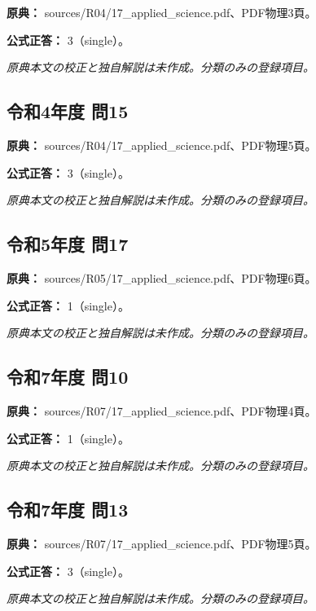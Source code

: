 \noindent\textbf{原典：} sources/R04/17\_applied\_science.pdf、PDF物理3頁。

\textbf{公式正答：} 3（single）。

\par\textit{原典本文の校正と独自解説は未作成。分類のみの登録項目。}

\subsection{令和4年度 問15}
\label{q:r04-reg-applied-15}

\noindent\textbf{原典：} sources/R04/17\_applied\_science.pdf、PDF物理5頁。

\textbf{公式正答：} 3（single）。

\par\textit{原典本文の校正と独自解説は未作成。分類のみの登録項目。}

\subsection{令和5年度 問17}
\label{q:r05-reg-applied-17}

\noindent\textbf{原典：} sources/R05/17\_applied\_science.pdf、PDF物理6頁。

\textbf{公式正答：} 1（single）。

\par\textit{原典本文の校正と独自解説は未作成。分類のみの登録項目。}

\subsection{令和7年度 問10}
\label{q:r07-reg-applied-10}

\noindent\textbf{原典：} sources/R07/17\_applied\_science.pdf、PDF物理4頁。

\textbf{公式正答：} 1（single）。

\par\textit{原典本文の校正と独自解説は未作成。分類のみの登録項目。}

\subsection{令和7年度 問13}
\label{q:r07-reg-applied-13}

\noindent\textbf{原典：} sources/R07/17\_applied\_science.pdf、PDF物理5頁。

\textbf{公式正答：} 3（single）。

\par\textit{原典本文の校正と独自解説は未作成。分類のみの登録項目。}

